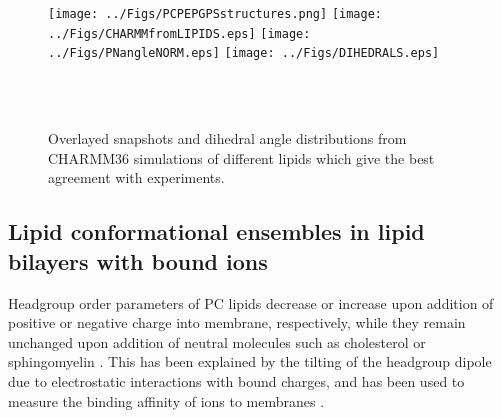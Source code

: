 \documentclass[aps,prl,superscriptaddress,twocolumn]{revtex4}
\begin{document}
\begin{figure*}[!h]
  \centering
  \texttt{[image: ../Figs/PCPEPGPSstructures.png]}
  \texttt{[image: ../Figs/CHARMMfromLIPIDS.eps]}
  \texttt{[image: ../Figs/PNangleNORM.eps]}
  \texttt{[image: ../Figs/DIHEDRALS.eps]}
  \caption{\label{structures}
    Overlayed snapshots and dihedral angle distributions from CHARMM36 simulations of different lipids
    which give the best agreement with experiments.
  }
   \\
   \\
\end{figure*}



\clearpage
\subsection{Lipid conformational ensembles in lipid bilayers with bound ions}

Headgroup order parameters of PC lipids decrease or increase upon addition of positive
or negative charge into membrane, respectively, while they remain unchanged upon addition
of neutral molecules such as cholesterol or sphingomyelin \cite{??}.
This has been explained by the tilting of the headgroup dipole due to electrostatic
interactions with bound charges, and has been used to measure the binding affinity
of ions to membranes \cite{??}.
\end{document}
